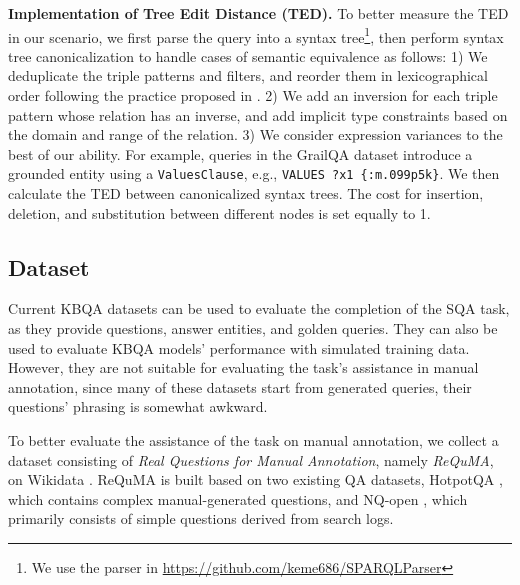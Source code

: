 \documentclass[runningheads]{llncs}
\begin{document}
\noindent\textbf{Implementation of Tree Edit Distance (TED).}
To better measure the TED in our scenario, we first parse the query into a syntax tree\footnote{We use the parser in \url{https://github.com/keme686/SPARQLParser}}, then perform syntax tree canonicalization to handle cases of semantic equivalence as follows:
1) We deduplicate the triple patterns and filters, and reorder them in lexicographical order following the practice proposed in \cite{salas2022semantics}.
2) We add an inversion for each triple pattern whose relation has an inverse,
and add implicit type constraints based on the domain and range of the relation.
3) We consider expression variances to the best of our ability. 
For example, queries in the GrailQA dataset introduce a grounded entity using a \texttt{ValuesClause}, e.g., \texttt{VALUES ?x1 \{:m.099p5k\}}.
We then calculate the TED between canonicalized syntax trees. The cost for insertion, deletion, and substitution between different nodes is set equally to 1. 


\subsection{Dataset} \label{subsec:dataset_discussion}
Current KBQA datasets can be used to evaluate the completion of the SQA task, as they provide questions, answer entities, and golden queries.
They can also be used to evaluate KBQA models' performance with simulated training data. 
However, they are not suitable for evaluating the task's assistance in manual annotation, since many of these datasets start from generated queries, their questions' phrasing is somewhat awkward.

To better evaluate the assistance of the task on manual annotation, we collect a dataset consisting of \textit{Real Questions for Manual Annotation}, namely \textit{ReQuMA}, on Wikidata \cite{vrandevcic2014wikidata}. ReQuMA is built based on two existing QA datasets, HotpotQA \cite{yang2018hotpotqa}, which contains complex manual-generated questions, and NQ-open \cite{lee2019latent}, which primarily consists of simple questions derived from search logs.
\end{document}
